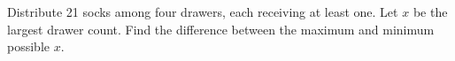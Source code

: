 Distribute 21 socks among four drawers, each receiving at least one. Let $x$ be the largest drawer count. Find the difference between the maximum and minimum possible $x$.
